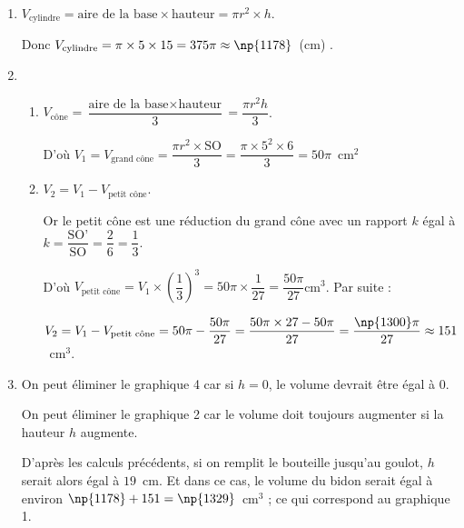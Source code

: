 
\medskip

\begin{enumerate}
\item $V_{\text{cylindre}} = \text{aire de la base}  \times \text{hauteur} = \pi r^2 \times h$.

Donc $V_{\text{cylindre}} = \pi \times5 \times 15 = 375 \pi  \approx \np{1178}$~(cm) .
\item  
	\begin{enumerate}
		\item $V_{\text{cône}} = \dfrac{\text{aire de la base}  \times \text{hauteur}}{3} = \dfrac{\pi r^2 h}{3}$.
		
D'où $V_1 = V_{\text{grand cône}} = \dfrac{\pi r^2 \times \text{SO}}{3}= \dfrac{\pi \times 5^2 \times 6}{3} = 50\pi$~cm$^2$
		\item $V_2 = V_1 - V_{\text{petit cône}}$.


Or le petit cône est une réduction du grand cône avec un rapport $k$ égal à $k = \dfrac{\text{SO'}}{\text{SO}} = \dfrac{2}{6} = \dfrac{1}{3}$.

D'où $V_{\text{petit cône}} = V_1 \times \left(\dfrac{1}{3} \right)^3 = 50 \pi \times \dfrac{1}{27} = \dfrac{50\pi}{27}$cm$^3$. Par suite :

$V_2 = V_1 - V_{\text{petit cône}} = 50\pi - \dfrac{50\pi}{27} = \dfrac{50\pi \times 27 - 50\pi}{27}  =  \dfrac{\np{1300}\pi}{27} \approx 151$~cm$^3$.
	\end{enumerate}
\item  On peut éliminer le graphique 4 car si $h = 0$, le volume devrait être égal \`{a} $0$.

On peut éliminer le graphique 2 car le volume doit toujours augmenter si la hauteur $h$ augmente.

D'après les calculs précédents, si on remplit le bouteille jusqu'au goulot, $h$ serait alors égal \`{a} $19$~cm. Et dans ce cas, le volume du bidon serait égal \`{a} environ $\np{1178} + 151 = \np{1329}$~cm$^3$ ; ce qui correspond au graphique 1.
\end{enumerate}

\vspace{0,5cm}


